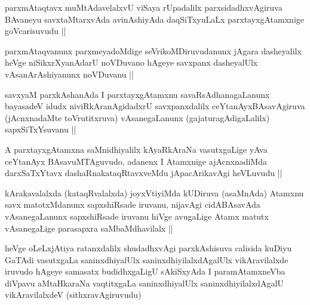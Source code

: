 \begin{artha}
parxmAtaqtavx muMtAdavelalxvU viSaya rUpadalilx parxsidadhxvAgiruva BAvaneyu savxtaMtarxvAda avinAshiyAda daqSiTxyuLaLx parxtayxgAtamxnige goVcarisuvudu ||
\end{artha}


\begin{artha}
parxmAtaqvanunx parxmeyadoMdige seVrikoMDiruvudanunx jAgara dasheyalilx heVge niSikxrXyanAdarU noVDuvano hAgeye savxpanx dasheyalUlx vAsanArAshiyanunx noVDuvanu ||
\end{artha}


\begin{artha}
savxyaM parxkAshanAda I parxtayxgAtamxnu savaRsAdhanagaLanunx bayasadeV idudx niviRkAranAgidadxrU savxpanxdalilx ceYtanAyxBAsavAgiruva (jAcnxnadaMte toVrutitxruva) vAsanegaLanunx (gajaturagAdigaLalilx) sapxSiTxYsuvanu ||
\end{artha}


\begin{artha}
A parxtayxgAtamxna saMnidhiyalilx kAyaRkAraNa vasutxgaLige yAva ceYtanAyx BAsavuMTAguvudo, adanenx I Atamxnige ajAcnxnadiMda darxSaTxYtavx dashaRnakataqRtavxveMdu jApacArikavAgi heVLuvudu ||
\end{artha}


\begin{artha}
kArakavalalxda (kataqRvalalxda) joyxVtiyiMda kUDiruva (asaMnAda) Atamxnu savx matotxMdanunx sapxshiRsade iruvanu, nijavAgi cidABAsavAda vAsanegaLanunx sapxshiRsade iruvanu hiVge avugaLige Atamx matutx vAsanegaLige parasapxra saMbaMdhavilalx ||
\end{artha}


\begin{artha}
heVge oLeLxjAtiya ratanxdalilx shudadhxvAgi parxkAshisuva calisida kuDiyu GaTAdi vasutxgaLa saninxdhiyalUlx saninxdhiyilalxdAgalUlx vikAravilalxde iruvudo hAgeye samasatx budidhxgaLigU sAkiSxyAda I paramAtamxneVba diVpavu aMtaHkaraNa vaqtitxgaLa saninxdhiyalUlx saninxdhiyilalxdAgalU vikAravilalxdeV (sithxravAgiruvudu)
\end{artha}


